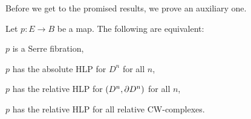 

Before we get to the promised results, we prove an auxiliary one.

\begin{lemma}\label{lemma:equivalent-HCP}
Let $p:E\to B$ be a map. The following are equivalent:
\begin{numerate}
\item $p$ is a Serre fibration,
\item $p$ has the absolute HLP for $D^n$ for all $n$,
\item $p$ has the relative HLP for $(D^n,\partial D^n)$ for all $n$,
\item $p$ has the relative HLP for all relative CW-complexes.
\end{numerate}
\end{lemma}

